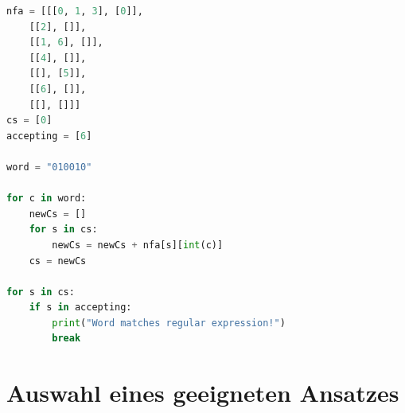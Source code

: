 \begin{lstlisting}[language=Python,
caption=Durchführung des Musterabgleichs mithilfe eines NFA,
label=nfa_matching]
nfa = [[[0, 1, 3], [0]],
	[[2], []],
	[[1, 6], []],
	[[4], []],
	[[], [5]],
	[[6], []],
	[[], []]]
cs = [0]
accepting = [6]

word = "010010"

for c in word:
	newCs = []
	for s in cs:
		newCs = newCs + nfa[s][int(c)]
	cs = newCs

for s in cs:
	if s in accepting:
		print("Word matches regular expression!")
		break
\end{lstlisting}

\section{Auswahl eines geeigneten Ansatzes}
